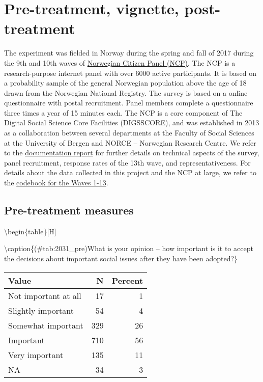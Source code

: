 \documentclass[
]{book}
\begin{document}
\hypertarget{pre-treatment-vignette-post-treatment}{%
\chapter{Pre-treatment, vignette, post-treatment}\label{pre-treatment-vignette-post-treatment}}

The experiment was fielded in Norway during the spring and fall of 2017 during the 9th and 10th waves of \href{https://www.uib.no/medborger}{Norwegian Citizen Panel (NCP)}. The NCP is a research-purpose internet panel with over 6000 active participants. It is based on a probability sample of the general Norwegian population above the age of 18 drawn from the Norwegian National Registry. The survey is based on a online questionnaire with postal recruitment. Panel members complete a questionnaire three times a year of 15 minutes each. The NCP is a core component of The Digital Social Science Core Facilities (DIGSSCORE), and was established in 2013 as a collaboration between several departments at the Faculty of Social Sciences at the University of Bergen and NORCE -- Norwegian Research Centre. We refer to the \href{Data/ncp-wave13-documentation.pdf}{documentation report} for further details on technical aspects of the survey, panel recruitment, response rates of the 13th wave, and representativeness. For details about the data collected in this project and the NCP at large, we refer to the \href{Data/ncp-wave13-codebook.pdf}{codebook for the Waves 1-13}.

\hypertarget{pre-treatment-measures-1}{%
\section{Pre-treatment measures}\label{pre-treatment-measures-1}}

\textbackslash begin\{table\}{[}H{]}

\textbackslash caption\{(\#tab:2031\_pre)What is your opinion -- how important is it to accept the decisions about important social issues after they have been adopted?\}
\centering

\begin{tabular}[t]{lrr}
\toprule
Value & N & Percent\\
\midrule
Not important at all & 17 & 1\\
Slightly important & 54 & 4\\
Somewhat important & 329 & 26\\
Important & 710 & 56\\
Very important & 135 & 11\\
NA & 34 & 3\\
\bottomrule
\end{tabular}
\end{document}
